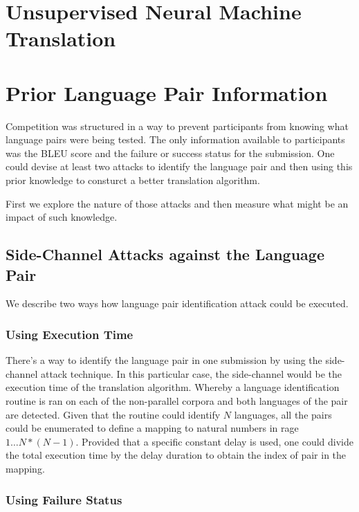 \documentclass[]{article}
\begin{document}
\section{Unsupervised Neural Machine Translation}
\label{sect:unmt}

\section{Prior Language Pair Information}
\label{sect:nonoblivious}

Competition was structured in a way to prevent participants from knowing what language pairs were being tested.
The only information available to participants was the BLEU score and the failure or success status for the submission.
One could devise at least two attacks to identify the language pair and then using this prior knowledge to consturct a better translation algorithm.

First we explore the nature of those attacks and then measure what might be an impact of such knowledge.

\subsection{Side-Channel Attacks against the Language Pair}
\label{sect:attack}

We describe two ways how language pair identification attack could be executed.

\subsubsection{Using Execution Time}

There's a way to identify the language pair in one submission by using the side-channel attack technique.
In this particular case, the side-channel would be the execution time of the translation algorithm.
Whereby a language identification routine is ran on each of the non-parallel corpora and both languages of the pair are detected.
Given that the routine could identify $N$ languages, all the pairs could be enumerated to define a mapping to natural numbers in rage $1\dots N*(N-1)$.
Provided that a specific constant delay is used, one could divide the total execution time by the delay duration to obtain the index of pair in the mapping.

\subsubsection{Using Failure Status}
\end{document}
